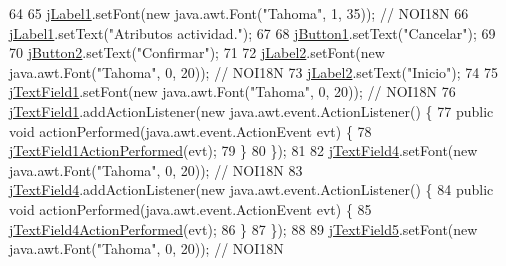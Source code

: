 \begin{DoxyCode}
64 
65         \mbox{\hyperlink{classsoftware_1_1parasoftware3_ae1871baf2f1bc751040bce3b2dc970c1}{jLabel1}}.setFont(\textcolor{keyword}{new} java.awt.Font(\textcolor{stringliteral}{"Tahoma"}, 1, 35)); \textcolor{comment}{// NOI18N}
66         \mbox{\hyperlink{classsoftware_1_1parasoftware3_ae1871baf2f1bc751040bce3b2dc970c1}{jLabel1}}.setText(\textcolor{stringliteral}{"Atributos actividad."});
67 
68         \mbox{\hyperlink{classsoftware_1_1parasoftware3_a64399e1ff0c22252784a8fb418269e32}{jButton1}}.setText(\textcolor{stringliteral}{"Cancelar"});
69 
70         \mbox{\hyperlink{classsoftware_1_1parasoftware3_aa69f792b77392d92a3821f9d35b0cf27}{jButton2}}.setText(\textcolor{stringliteral}{"Confirmar"});
71 
72         \mbox{\hyperlink{classsoftware_1_1parasoftware3_ada0c2e8fce30c1215e2a30042d386f00}{jLabel2}}.setFont(\textcolor{keyword}{new} java.awt.Font(\textcolor{stringliteral}{"Tahoma"}, 0, 20)); \textcolor{comment}{// NOI18N}
73         \mbox{\hyperlink{classsoftware_1_1parasoftware3_ada0c2e8fce30c1215e2a30042d386f00}{jLabel2}}.setText(\textcolor{stringliteral}{"Inicio"});
74 
75         \mbox{\hyperlink{classsoftware_1_1parasoftware3_a3415ad58f32ae42cfc88f7b498a2db38}{jTextField1}}.setFont(\textcolor{keyword}{new} java.awt.Font(\textcolor{stringliteral}{"Tahoma"}, 0, 20)); \textcolor{comment}{// NOI18N}
76         \mbox{\hyperlink{classsoftware_1_1parasoftware3_a3415ad58f32ae42cfc88f7b498a2db38}{jTextField1}}.addActionListener(\textcolor{keyword}{new} java.awt.event.ActionListener() \{
77             \textcolor{keyword}{public} \textcolor{keywordtype}{void} actionPerformed(java.awt.event.ActionEvent evt) \{
78                 \mbox{\hyperlink{classsoftware_1_1parasoftware3_a0cfede9cef6efbcec21f11c242a315c6}{jTextField1ActionPerformed}}(evt);
79             \}
80         \});
81 
82         \mbox{\hyperlink{classsoftware_1_1parasoftware3_a49b508e80d5a8bb6886b95f79fc5446e}{jTextField4}}.setFont(\textcolor{keyword}{new} java.awt.Font(\textcolor{stringliteral}{"Tahoma"}, 0, 20)); \textcolor{comment}{// NOI18N}
83         \mbox{\hyperlink{classsoftware_1_1parasoftware3_a49b508e80d5a8bb6886b95f79fc5446e}{jTextField4}}.addActionListener(\textcolor{keyword}{new} java.awt.event.ActionListener() \{
84             \textcolor{keyword}{public} \textcolor{keywordtype}{void} actionPerformed(java.awt.event.ActionEvent evt) \{
85                 \mbox{\hyperlink{classsoftware_1_1parasoftware3_a7cb85bd10b5032e0558802540683510f}{jTextField4ActionPerformed}}(evt);
86             \}
87         \});
88 
89         \mbox{\hyperlink{classsoftware_1_1parasoftware3_acd863025f5ab774c7139623c6dab2f9b}{jTextField5}}.setFont(\textcolor{keyword}{new} java.awt.Font(\textcolor{stringliteral}{"Tahoma"}, 0, 20)); \textcolor{comment}{// NOI18N}

\end{DoxyCode}
